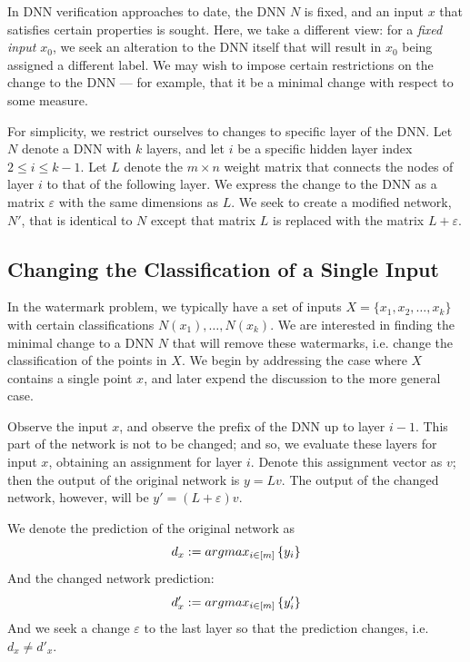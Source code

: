 \documentclass{easychair}
\newcommand{\guy}[1]{\marginpar{\textcolor{orange}{Guy: #1}}}
\begin{document}
In DNN verification approaches to date, the DNN $N$ is fixed, and an input
$x$ that satisfies certain properties is sought. Here, we take a different
view: for a \emph{fixed input} $x_0$, we seek an alteration to the DNN
itself that will result in $x_0$ being assigned a different label. We
may wish to impose certain restrictions on the change to the DNN ---
for example, that it be a minimal change with respect to some
measure. 

\guy{To think if we really need to restrict this to the last layer}
For simplicity, we restrict ourselves to changes to specific layer of
the DNN. Let $N$ denote a DNN with $k$ layers, and let $i$ be a specific hidden layer index
$2\leq i\leq k-1$. Let $L$ denote the $m\times n$ weight matrix that connects the nodes of layer
$i$ to that of the following layer. We express the change to the DNN
as a matrix $\varepsilon$ with the same dimensions as $L$. We seek to
create a modified network, $N'$, that is identical to $N$ except that
matrix $L$ is replaced with the matrix $L+\varepsilon$.

\subsection{Changing the Classification of a Single Input}
\label{sec:defineProblem1}

In the watermark problem, we typically have a set of inputs $X=\{x_1,
x_2, \ldots, x_k\}$ with certain classifications
$N(x_1),\ldots,N(x_k)$. We are interested in finding the minimal
change to a DNN $N$ that will remove these watermarks, i.e. change the
classification of the points in $X$. We begin by addressing the case
where $X$ contains a single point $x$, and later expend the discussion
to the more general case.

Observe the input $x$, and observe the prefix of the DNN up to layer
$i-1$. This part of the network is not to be changed; and so, we
evaluate these layers for input $x$, obtaining an assignment for layer
$i$. Denote this assignment vector as $v$; then the output of the
original network is $y=Lv$. The output of the changed network,
however, will be $y'=(L+\varepsilon)v$.

We denote the prediction of the original network as 
\[
   	d_x := argmax_{i\in \left[m\right]}\left\lbrace y_i\right\rbrace
\]
And the changed network prediction:
\[
   	d'_x := argmax_{i\in \left[m\right]}\left\lbrace y'_i\right\rbrace
\]
And we seek a change $\varepsilon$ to the last layer so that the prediction changes, i.e. $d_x\neq d'_x$.
\end{document}
